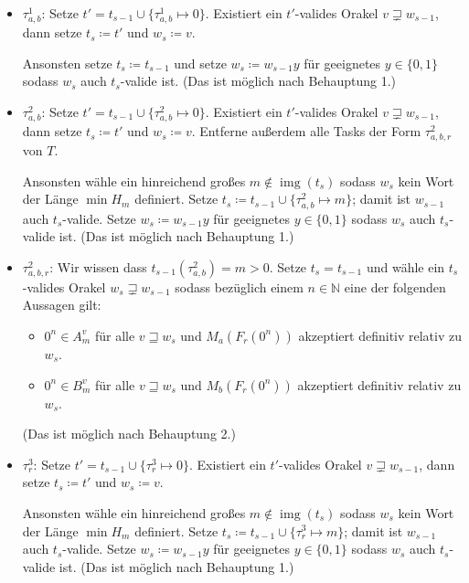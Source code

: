 \documentclass[nofonts]{uebung}
\DeclareMathOperator{\img}{img}
\begin{document}
\begin{itemize}

    \item $\tau^1_{a,b}$: Setze $t'=t_{s-1}\cup\{\tau^1_{a,b}\mapsto 0\}$. Existiert ein $t'$-valides Orakel $v\sqsupsetneq w_{s-1}$, dann setze $t_s\coloneqq t'$ und $w_s\coloneqq v$.

        Ansonsten setze $t_s\coloneqq t_{s-1}$ und setze $w_s\coloneqq w_{s-1}y$ für geeignetes $y\in\{0,1\}$ sodass $w_s$ auch $t_s$-valide ist. (Das ist möglich nach Behauptung 1.)

    \item $\tau^2_{a,b}$: Setze $t'=t_{s-1}\cup\{\tau^2_{a,b}\mapsto 0\}$. Existiert ein $t'$-valides Orakel $v\sqsupsetneq w_{s-1}$, dann setze $t_s\coloneqq t'$ und $w_s\coloneqq v$. Entferne außerdem alle Tasks der Form $\tau^2_{a,b,r}$ von $T$.

        Ansonsten wähle ein hinreichend großes $m\not\in \img(t_s)$ sodass $w_s$ kein Wort der Länge $\min H_m$ definiert. Setze $t_s\coloneqq t_{s-1}\cup \{ \tau^2_{a,b}\mapsto m \}$; damit ist $w_{s-1}$ auch $t_s$-valide. Setze $w_s\coloneqq w_{s-1}y$ für geeignetes $y\in\{0,1\}$ sodass $w_s$ auch $t_s$-valide ist. (Das ist möglich nach Behauptung 1.)

    \item $\tau^2_{a,b,r}$: Wir wissen dass $t_{s-1}(\tau^2_{a,b})=m>0$. Setze $t_s=t_{s-1}$ und wähle ein $t_s$-valides Orakel $w_s\sqsupsetneq w_{s-1}$ sodass bezüglich einem $n\in\mathbb N$ eine der folgenden Aussagen gilt:
        \begin{itemize}[nosep,endpenalty=10000]
            \item $0^n\in A_m^v$ für alle $v\sqsupseteq w_s$ und $M_a(F_r(0^n))$ akzeptiert definitiv relativ zu $w_s$.
            \item $0^n\in B_m^v$ für alle $v\sqsupseteq w_s$ und $M_b(F_r(0^n))$ akzeptiert definitiv relativ zu $w_s$.
        \end{itemize} (Das ist möglich nach Behauptung 2.)

    \item $\tau^3_{r}$: Setze $t'=t_{s-1}\cup\{\tau^3_{r}\mapsto 0\}$. Existiert ein $t'$-valides Orakel $v\sqsupsetneq w_{s-1}$, dann setze $t_s\coloneqq t'$ und $w_s\coloneqq v$. 

        Ansonsten wähle ein hinreichend großes $m\not\in \img(t_s)$ sodass $w_s$ kein Wort der Länge $\min H_m$ definiert. Setze $t_s\coloneqq t_{s-1}\cup \{ \tau^3_{r}\mapsto m \}$; damit ist $w_{s-1}$ auch $t_s$-valide. Setze $w_s\coloneqq w_{s-1}y$ für geeignetes $y\in\{0,1\}$ sodass $w_s$ auch $t_s$-valide ist. (Das ist möglich nach Behauptung 1.)
\end{itemize}
\end{document}
